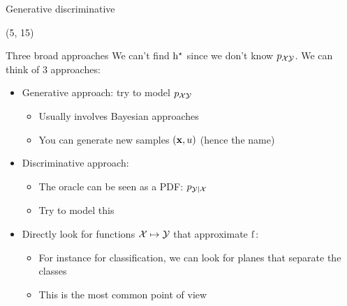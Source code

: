 \begin{frame}{Generative \vs{} discriminative}

  \begin{textblock}{90}(5, 15)
    \begin{block}{Three broad approaches}
      We can't find $\mathrm{h}^{\star}$ since we don't know $p_{\mathcal{X} \mathcal{Y}}$.
      We can think of 3 approaches:
      \begin{itemize}
      \item<2-> Generative approach: try to model $p_{\mathcal{X} \mathcal{Y}}$
        \begin{itemize}
        \item Usually involves Bayesian approaches
        \item You can generate new samples $\left ( {\mathbf{x}}, {u} \right )$
          (hence the name)
        \end{itemize}
      \item<3-> Discriminative approach:
        \begin{itemize}
        \item The oracle can be seen as a PDF: $p_{\mathcal{Y} | \mathcal{X}}$
        \item Try to model this
        \end{itemize}
      \item<4-> Directly look for functions $\mathcal{X} \mapsto \mathcal{Y}$ that
        approximate $\mathrm{f}$:
        \begin{itemize}
        \item For instance for classification, we can look for planes that
          separate the classes
        \item This is the most common point of view
        \end{itemize}
      \end{itemize}
  \end{block}
  \end{textblock}
\end{frame}


